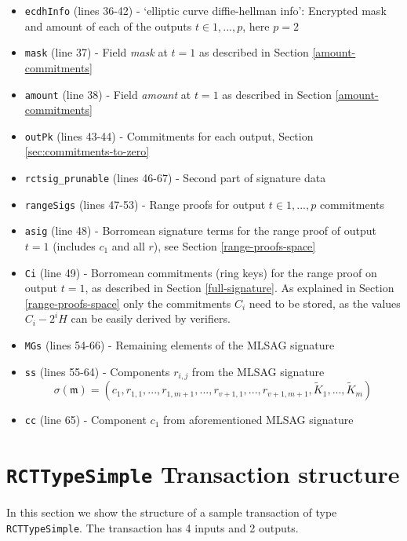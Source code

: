 \begin{appendices}
\begin{itemize}
	\item {\tt ecdhInfo} (lines 36-42) - ‘elliptic curve diffie-hellman info’: Encrypted mask and amount of each of the outputs $t \in {1, ..., p}$, here $p = 2$
	\item {\tt mask} (line 37) - Field {\sl mask} at $t = 1$ as described in Section \ref{amount-commitments}
    \item {\tt amount} (line 38) - Field {\sl amount} at $t = 1$ as described in Section \ref{amount-commitments}
    \item {\tt outPk} (lines 43-44) - Commitments for each output, Section \ref{sec:commitments-to-zero}
    
    \item {\tt rctsig\_prunable} (lines 46-67) - Second part of signature data
    \item {\tt rangeSigs} (lines 47-53) - Range proofs for output $t \in {1, ..., p}$ commitments 
    \item {\tt asig} (line 48) - Borromean signature terms for the range proof of output $t = 1$ (includes $c_1$ and all $r$), see Section \ref{range-proofs-space} 
    \item {\tt Ci} (line 49) -  Borromean commitments (ring keys) for the range proof on output $t = 1$, as described in Section \ref{full-signature}. As explained in Section \ref{range-proofs-space} only the commitments $C_i$ need to be stored, as the values $C_i -2^i H$ can be easily derived by verifiers. 
    \item {\tt MGs} (lines 54-66) - Remaining elements of the MLSAG signature
    \item {\tt ss} (lines 55-64) - Components \(r_{i,j}\) from the MLSAG signature
      \[\sigma(\mathfrak{m}) = (c_1, r_{1, 1}, ..., r_{1, m+1}, ..., r_{v+1, 1}, ..., r_{v+1, m+1}, \tilde{K}_1, ...,  \tilde{K}_m) \]
    \item {\tt cc} (line 65) - Component \(c_1\) from aforementioned MLSAG signature
	
\end{itemize}



\chapter{{\tt RCTTypeSimple} Transaction structure}
\label{appendix:RCTTypeSimple}


In this section we show the structure of a sample transaction of type {\tt RCTTypeSimple}. The transaction has 4 inputs and 2 outputs.




\end{appendices}
